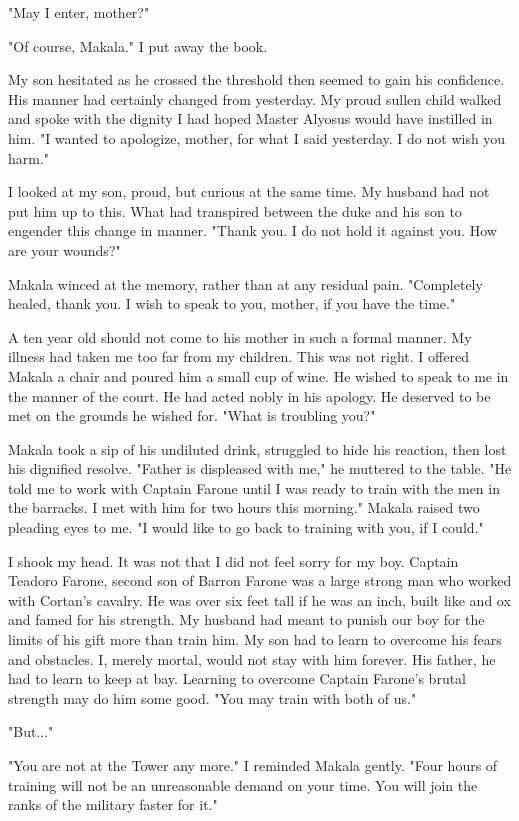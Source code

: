 \documentclass{article}
\begin{document}
"May I enter, mother?"

"Of course, Makala." I put away the book. 

My son hesitated as he crossed the threshold then seemed to gain his confidence. His manner had certainly changed from yesterday. My proud sullen child walked and spoke with the dignity I had hoped Master Alyosus would have instilled in him. "I wanted to apologize, mother, for what I said yesterday. I do not wish you harm."

I looked at my son, proud, but curious at the same time. My husband had not put him up to this. What had transpired between the duke and his son to engender this change in manner. "Thank you. I do not hold it against you. How are your wounds?"

Makala winced at the memory, rather than at any residual pain. "Completely healed, thank you. I wish to speak to you, mother, if you have the time."

A ten year old should not come to his mother in such a formal manner. My illness had taken me too far from my children. This was not right. I offered Makala a chair and poured him a small cup of wine. He wished to speak to me in the manner of the court. He had acted nobly in his apology. He deserved to be met on the grounds he wished for. "What is troubling you?"

Makala took a sip of his undiluted drink, struggled to hide his reaction, then lost his dignified resolve. "Father is displeased with me," he muttered to the table. "He told me to work with Captain Farone until I was ready to train with the men in the barracks. I met with him for two hours this morning." Makala raised two pleading eyes to me. "I would like to go back to training with you, if I could."

I shook my head. It was not that I did not feel sorry for my boy. Captain Teadoro Farone, second son of Barron Farone was a large strong man who worked with Cortan's cavalry. He was over six feet tall if he was an inch, built like and ox and famed for his strength. My husband had meant to punish our boy for the limits of his gift more than train him. My son had to learn to overcome his fears and obstacles. I, merely mortal, would not stay with him forever. His father, he had to learn to keep at bay. Learning to overcome Captain Farone's brutal strength may do him some good. "You may train with both of us."

"But..."

"You are not at the Tower any more." I reminded Makala gently. "Four hours of training will not be an unreasonable demand on your time. You will join the ranks of the military faster for it."
\end{document}
